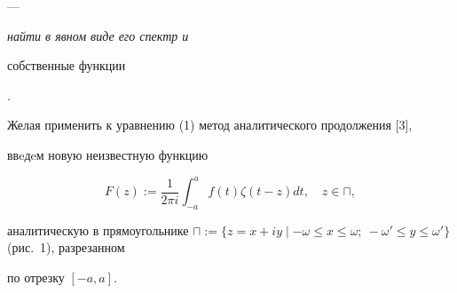 --- {\it найти в явном виде  его спектр и


собственные функции}.





Желая применить к уравнению (1) метод аналитического продолжения [3],


ввeдeм новую неизвестную функцию


\begin{equation}


F(z):=\dfrac{1}{2\pi i}\int^{a}_{-a}f(t)\zeta(t-z)dt,\quad


z\in \sqcap,


\end{equation}


аналитическую в прямоугольнике $\sqcap:=\{z=x+iy \mid


-\omega\leqslant x \leqslant \omega;\


-\omega'\leqslant y \leqslant \omega'\}$ (рис.~1), разрезанном


по отрезку $[-a,a]$.


